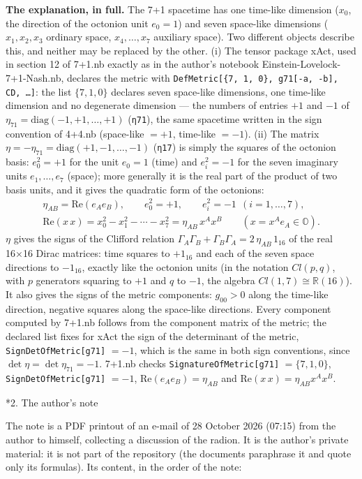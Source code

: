 \documentclass[10pt,a4paper]{article}
\makeatletter
\renewcommand\section{\@startsection{section}{1}{\z@}{-3.5ex \@plus -1ex \@minus -.2ex}{2.3ex \@plus.2ex}{\normalfont\Large\bfseries\raggedright}}
\makeatother
\begin{document}
\textbf{The explanation, in full.} The 7+1 spacetime has one time-like dimension ($x_0$, the direction of the octonion unit $e_0=1$) and seven space-like dimensions ($x_1,x_2,x_3$ ordinary space, $x_4,\dots,x_7$ auxiliary space). Two different objects describe this, and neither may be replaced by the other. (i) The tensor package xAct, used in section 12 of 7+1.nb exactly as in the author’s notebook Einstein-Lovelock-7+1-Nash.nb, declares the metric with \texttt{DefMetric[\{7, 1, 0\}, g71[-a, -b], CD, …]}: the list $\{7,1,0\}$ declares seven space-like dimensions, one time-like dimension and no degenerate dimension — the numbers of entries $+1$ and $-1$ of $\eta_{71}=\mathrm{diag}(-1,+1,\dots,+1)$ (\texttt{η71}), the same spacetime written in the sign convention of 4+4.nb (space-like $=+1$, time-like $=-1$). (ii) The matrix $\eta=-\eta_{71}=\mathrm{diag}(+1,-1,\dots,-1)$ (\texttt{η17}) is simply the squares of the octonion basis: $e_0^2=+1$ for the unit $e_0=1$ (time) and $e_i^2=-1$ for the seven imaginary units $e_1,\dots,e_7$ (space); more generally it is the real part of the product of two basis units, and it gives the quadratic form of the octonions:
\begin{gather*}
\eta_{AB}=\mathrm{Re}(e_Ae_B),\qquad e_0^2=+1,\qquad e_i^2=-1\ \ (i=1,\dots,7),\\ \mathrm{Re}(x\,x)=x_0^2-x_1^2-\cdots-x_7^2=\eta_{AB}\,x^Ax^B\qquad (x=x^Ae_A\in\mathbb O).
\end{gather*}
$\eta$ gives the signs of the Clifford relation $\Gamma_A\Gamma_B+\Gamma_B\Gamma_A=2\,\eta_{AB}\,1_{16}$ of the real 16×16 Dirac matrices: time squares to $+1_{16}$ and each of the seven space directions to $-1_{16}$, exactly like the octonion units (in the notation $Cl(p,q)$, with $p$ generators squaring to $+1$ and $q$ to $-1$, the algebra $Cl(1,7)\cong\mathbb R(16)$). It also gives the signs of the metric components: $g_{00}>0$ along the time-like direction, negative squares along the space-like directions. Every component computed by 7+1.nb follows from the component matrix of the metric; the declared list fixes for xAct the sign of the determinant of the metric, \texttt{SignDetOfMetric[g71]} $=-1$, which is the same in both sign conventions, since $\det \eta=\det \eta_{71}=-1$. 7+1.nb checks \texttt{SignatureOfMetric[g71]} $=\{7,1,0\}$, \texttt{SignDetOfMetric[g71]} $=-1$, $\mathrm{Re}(e_Ae_B)=\eta_{AB}$ and $\mathrm{Re}(x\,x)=\eta_{AB}x^Ax^B$.

\section*{2. The author’s note}
The note is a PDF printout of an e-mail of 28 October 2026 (07:15) from the author to himself, collecting a discussion of the radion. It is the author’s private material: it is not part of the repository (the documents paraphrase it and quote only its formulas). Its content, in the order of the note:
\end{document}
